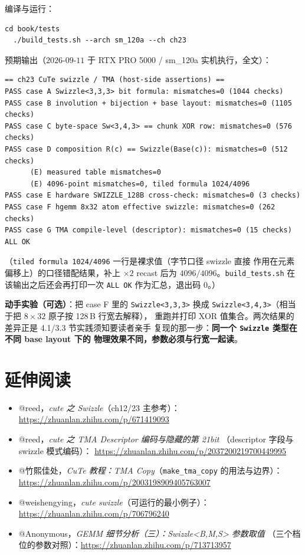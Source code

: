 编译与运行：

\begin{lstlisting}[style=console]
  cd book/tests
  ./build_tests.sh --arch sm_120a --ch ch23
\end{lstlisting}

预期输出（$2026$-$09$-$11$ 于 RTX PRO 5000 / sm\_120a 实机执行，全文）：

\begin{lstlisting}[style=console]
== ch23 CuTe swizzle / TMA (host-side assertions) ==
PASS case A Swizzle<3,3,3> bit formula: mismatches=0 (1044 checks)
PASS case B involution + bijection + base layout: mismatches=0 (1105 checks)
PASS case C byte-space Sw<3,4,3> == chunk XOR row: mismatches=0 (576 checks)
PASS case D composition R(c) == Swizzle(Base(c)): mismatches=0 (512 checks)
      (E) measured table mismatches=0
      (E) 4096-point mismatches=0, tiled formula 1024/4096
PASS case E hardware SWIZZLE_128B cross-check: mismatches=0 (3 checks)
PASS case F hgemm 8x32 atom effective swizzle: mismatches=0 (262 checks)
PASS case G TMA compile-level (descriptor): mismatches=0 (15 checks)
ALL OK
\end{lstlisting}
（\texttt{tiled formula 1024/4096} 一行是裸求值（字节口径 swizzle 直接
作用在元素偏移上）的口径错配结果，补上 $\times2$ recast 后为
$4096/4096$。\texttt{build\_\allowbreak{}tests.\allowbreak{}sh} 在该输出之后还会再打印一次
\texttt{ALL OK} 作为汇总，退出码 $0$。）

\textbf{动手实验（可选）}：把 case F 里的 \texttt{Swizzle\allowbreak{}<3,\allowbreak{}3,\allowbreak{}3>} 换成
\texttt{Swizzle\allowbreak{}<3,\allowbreak{}4,\allowbreak{}3>}（相当于把 $8\times32$ 原子按 128\,B 行宽去解释），
重跑并打印 XOR 值集合。两次结果的差异正是 4.1/3.3 节实践须知要读者亲手
复现的那一步：\textbf{同一个 \texttt{Swizzle} 类型在不同 base layout 下的
物理效果不同，参数必须与行宽一起读}。

\section*{延伸阅读}

\begin{itemize}[leftmargin=1.6em]
\item @reed，\emph{cute 之 Swizzle}（ch12/23 主参考）：
\url{https://zhuanlan.zhihu.com/p/671419093}
\item @reed，\emph{cute 之 TMA Descriptor 编码与隐藏的第 21bit}
（descriptor 字段与 swizzle 模式编码）：
\url{https://zhuanlan.zhihu.com/p/2037200219700449995}
\item @竹熙佳处，\emph{CuTe 教程：TMA Copy}（\texttt{make\_\allowbreak{}tma\_\allowbreak{}copy}
的用法与边界）：
\url{https://zhuanlan.zhihu.com/p/2003198909405763007}
\item @weishengying，\emph{cute swizzle}（可运行的最小例子）：
\url{https://zhuanlan.zhihu.com/p/706796240}
\item @Anonymous，\emph{GEMM 细节分析（三）：Swizzle<B,M,S> 参数取值}
（三个档位的参数对照）：\url{https://zhuanlan.zhihu.com/p/713713957}
\end{itemize}
